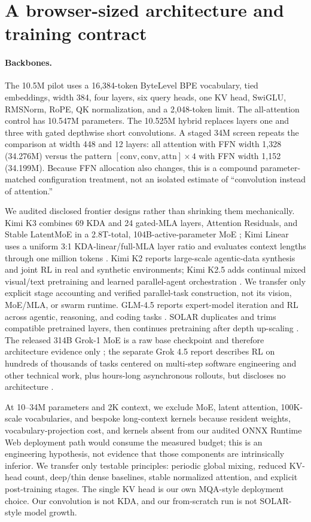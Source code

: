 \documentclass{article}
\begin{document}
\section{A browser-sized architecture and training contract}

\paragraph{Backbones.}
The 10.5M pilot uses a 16,384-token ByteLevel BPE vocabulary, tied embeddings, width 384, four
layers, six query heads, one KV head, SwiGLU, RMSNorm, RoPE, QK normalization, and a 2,048-token
limit.  The all-attention control has 10.547M parameters.  The 10.525M hybrid replaces layers one
and three with gated depthwise short convolutions.  A staged 34M screen repeats the comparison at
width 448 and 12 layers: all attention with FFN width 1,328 (34.276M) versus the pattern
\(\mathrm{[conv,conv,attn]}\times4\) with FFN width 1,152 (34.199M).  Because FFN allocation also
changes, this is a compound parameter-matched configuration treatment, not an isolated estimate
of ``convolution instead of attention.''

We audited disclosed frontier designs rather than shrinking them mechanically.  Kimi K3 combines
69 KDA and 24 gated-MLA layers, Attention Residuals, and Stable LatentMoE in a 2.8T-total,
104B-active-parameter MoE \citep{kimiteam2026k3}; Kimi Linear uses a uniform 3:1
KDA-linear/full-MLA layer ratio and evaluates context lengths through one million tokens
\citep{kimiteam2025linear}.  Kimi K2 reports large-scale agentic-data synthesis and joint RL in
real and synthetic environments; Kimi K2.5 adds continual mixed visual/text pretraining and
learned parallel-agent orchestration \citep{kimiteam2025k2,kimiteam2026k25}.  We transfer only
explicit stage accounting and verified parallel-task construction, not its vision, MoE/MLA, or
swarm runtime.  GLM-4.5 reports expert-model iteration and RL across agentic, reasoning, and
coding tasks \citep{glmteam2025glm45}.  SOLAR duplicates
and trims compatible pretrained layers, then continues pretraining after depth up-scaling
\citep{kim2024solar}.  The released 314B Grok-1 MoE is a raw base checkpoint and therefore
architecture evidence only \citep{xai2024grok}; the separate Grok 4.5 report describes RL on
hundreds of thousands of tasks centered on multi-step software engineering and other technical
work, plus hours-long asynchronous rollouts, but discloses no architecture
\citep{xai2026grok45}.

At 10--34M parameters and 2K context, we exclude MoE, latent attention, 100K-scale vocabularies,
and bespoke long-context kernels because resident weights, vocabulary-projection cost, and kernels
absent from our audited ONNX Runtime Web deployment path would consume the measured budget; this
is an engineering hypothesis, not evidence that those components are intrinsically inferior.
We transfer only testable
principles: periodic global mixing, reduced KV-head count, deep/thin dense baselines, stable
normalized attention, and explicit post-training stages.  The single KV head is our own
MQA-style deployment choice.  Our convolution is not KDA, and our from-scratch run is not
SOLAR-style model growth.
\end{document}
